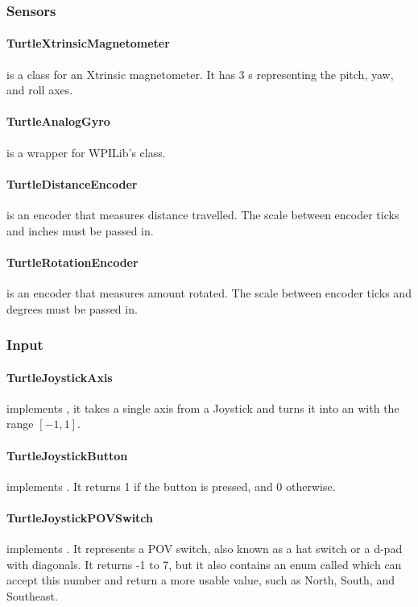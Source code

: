 \documentclass[]{report}
\begin{document}
\subsubsection{Sensors}
\paragraph{TurtleXtrinsicMagnetometer}
 is a class for an Xtrinsic magnetometer.
It has 3 s representing the pitch, yaw, and roll axes.
\paragraph{TurtleAnalogGyro}
 is a wrapper for WPILib's  class.
\paragraph{TurtleDistanceEncoder}
 is an encoder that measures distance travelled.
The scale between encoder ticks and inches must be passed in.
\paragraph{TurtleRotationEncoder}
 is an encoder that measures amount rotated.
The scale between encoder ticks and degrees must be passed in.

\subsubsection{Input}
\paragraph{TurtleJoystickAxis}
 implements , it takes a single axis from a Joystick and turns it into an  with the range $[-1,1]$.
\paragraph{TurtleJoystickButton}
 implements .
It returns 1 if the button is pressed, and 0 otherwise.
\paragraph{TurtleJoystickPOVSwitch}
 implements .
It represents a POV switch, also known as a hat switch or a d-pad with diagonals.
It returns -1 to 7, but it also contains an enum called  which can accept this number and return a more usable value, such as North, South, and Southeast.
\end{document}
